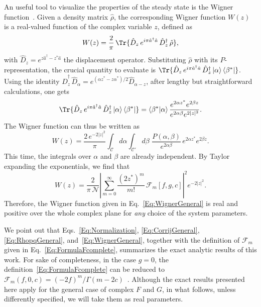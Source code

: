 An useful tool to visualize the properties of the steady state is the Wigner function~\cite{WignerPR32}.
Given a density matrix $\hat{\rho}$, the corresponding Wigner function $W(z)$ is a real-valued function of the complex variable $z$, defined as~\cite{CahillPR69}
\begin{equation}
W(z)=\frac{2}{\pi}\,\Tr{\hat{D}_z\, e^{i\pi {\hat{a}^\dagger}{\hat{a}}}\, \hat{D}_z^\dagger\, \hat{\rho}},
\end{equation}
with $\hat{D}_z=e^{z {\hat{a}^\dagger}- z^* {\hat{a}}}$ the displacement operator.
Substituting $\hat{\rho}$ with its $P$-representation, the crucial quantity to evaluate is $\Tr{\hat{D}_z\, e^{i\pi {\hat{a}^\dagger}{\hat{a}}}\, \hat{D}_z^\dagger\ket{\alpha}\bra{\beta^*}}$.
Using the identity $\hat{D}_z^\dagger\,\hat{D}_\alpha=e^{(\alpha z^*\!-z\alpha^*)/2} \hat{D}_{\alpha-z}$, after lengthy but straightforward calculations, one gets
\begin{align}
\Tr{\hat{D}_z\, e^{i\pi {\hat{a}^\dagger}{\hat{a}}}\, \hat{D}_z^\dagger\ket{\alpha}\bra{\beta^*}}
=\braket{\beta^*|\alpha}\frac{e^{2\alpha z^*} e^{2\beta z}}{e^{2\alpha\beta} e^{2|z|^2}}.
\end{align}
The Wigner function can thus be written as
\begin{equation}
W(z)=\frac{2\,e^{-2|z|^2}}{\pi}
\int_\mathcal{C}\!\!d\alpha \int_{\mathcal{C}'}\!\!d\beta\,\,
\frac{P(\alpha,\beta)}{e^{2\alpha\beta}}\,
e^{2\alpha z^*} e^{2\beta z}.
\end{equation}
This time, the integrals over $\alpha$ and $\beta$ are already independent.
By Taylor expanding the exponentials, we find that
\begin{equation}
\label{Eq:WignerGeneral}
W(z)=\frac{2}{\pi\,{\mathcal{N}}} \left|
\sum_{m=0}^{\infty} \frac{(2z^*)^m}{m!}\, {\mathcal{F}}_m\left[f,g,c\right]
\right|^2 e^{-2|z|^2}.
\end{equation}
Therefore, the Wigner function given in Eq.~\eqref{Eq:WignerGeneral} is real and positive over the whole complex plane for \emph{any} choice of the system parameters.

We point out that Eqs.~\eqref{Eq:Normalization}, \eqref{Eq:CorrijGeneral}, \eqref{Eq:RhopqGeneral}, and~\eqref{Eq:WignerGeneral}, together with the definition of ${\mathcal{F}}_m$ given in Eq.~\eqref{Eq:FormulaFcomplete}, summarizes the exact analytic results of this work.
For sake of completeness, in the case $g=0$, the definition~\eqref{Eq:FormulaFcomplete} can be reduced to \mbox{${\mathcal{F}}_m(f,0,c)=(-2f)^m/\Gamma(m-2c)$}~\cite{DrummondJPA80a}.
Although the exact results presented here apply for the general case of complex $F$ and $G$, in what follows, unless differently specified, we will take them as real parameters.


